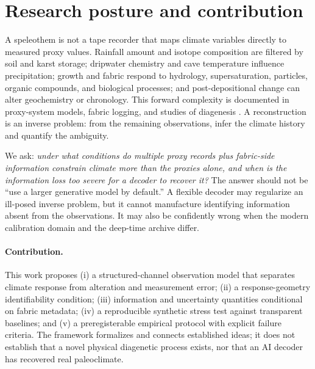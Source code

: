 \documentclass[11pt,a4paper]{article}
\begin{document}
\section{Research posture and contribution}
A speleothem is not a tape recorder that maps climate variables directly to measured proxy values. Rainfall amount and isotope composition are filtered by soil and karst storage; dripwater chemistry and cave temperature influence precipitation; growth and fabric respond to hydrology, supersaturation, particles, organic compounds, and biological processes; and post-depositional change can alter geochemistry or chronology. This forward complexity is documented in proxy-system models, fabric logging, and studies of diagenesis \citep{CaveCalc2018,Frisia2015,Scholz2014,PSMAssessment2021}. A reconstruction is an inverse problem: from the remaining observations, infer the climate history and quantify the ambiguity.

We ask: \emph{under what conditions do multiple proxy records plus fabric-side information constrain climate more than the proxies alone, and when is the information loss too severe for a decoder to recover it?} The answer should not be “use a larger generative model by default.” A flexible decoder may regularize an ill-posed inverse problem, but it cannot manufacture identifying information absent from the observations. It may also be confidently wrong when the modern calibration domain and the deep-time archive differ.

\paragraph{Contribution.} This work proposes (i) a structured-channel observation model that separates climate response from alteration and measurement error; (ii) a response-geometry identifiability condition; (iii) information and uncertainty quantities conditional on fabric metadata; (iv) a reproducible synthetic stress test against transparent baselines; and (v) a preregisterable empirical protocol with explicit failure criteria. The framework formalizes and connects established ideas; it does not establish that a novel physical diagenetic process exists, nor that an AI decoder has recovered real paleoclimate.
\end{document}
